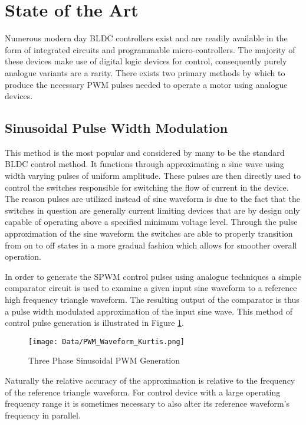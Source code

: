 \documentclass[12pt]{article}
\begin{document}
\section{State of the Art}%

Numerous modern day BLDC controllers exist and are readily available in the form of integrated circuits and programmable micro-controllers. The majority of these devices make use of digital logic devices for control, consequently purely analogue variants are a rarity. There exists two primary methods by which to produce the necessary PWM pulses needed to operate a motor using analogue devices.
\pagebreak
\subsection{Sinusoidal Pulse Width Modulation}%

This method is the most popular and considered by many to be the standard BLDC control method. It functions through approximating a sine wave using width varying pulses of uniform amplitude. These pulses are then directly used to control the switches responsible for switching the flow of current in the device. The reason pulses are utilized instead of sine waveform is due to the fact that the switches in question are generally current limiting devices that are by design only capable of operating above a specified minimum voltage level. Through the pulse approximation of the sine waveform the switches are able to properly transition from on to off states in a more gradual fashion which allows for smoother overall operation.

In order to generate the SPWM control pulses using analogue techniques a simple comparator circuit is used to examine a given input sine waveform to a reference high frequency triangle waveform. The resulting output of the comparator is thus a pulse width modulated approximation of the input sine wave. This method of control pulse generation is illustrated in Figure \ref{SPWMSample}.

\begin{figure}[H]
\centering
\caption{Three Phase Sinusoidal PWM Generation\cite{developer}}
\texttt{[image: Data/PWM\_Waveform\_Kurtis.png]}
\label{SPWMSample}
\end{figure}

Naturally the relative accuracy of the approximation is relative to the frequency of the reference triangle waveform. For control device with a large operating frequency range it is sometimes necessary to also alter its reference waveform's frequency in parallel.
\pagebreak
\end{document}
